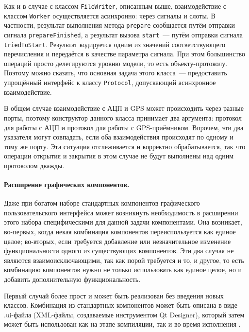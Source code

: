 \documentclass[a4paper, 14pt, titlepage]{extarticle}
\newcommand{\inlinecode}[1]{\lstinline[basicstyle=\ttfamily]{#1}}
\newcommand{\eng}[1]{\foreignlanguage{english}{#1}}
\begin{document}
  Как и в случае с классом \inlinecode{FileWriter}, описанным выше, взаимодействие с классом
  \inlinecode{Worker} осуществляется асинхронно: через сигналы и слоты. В частности, результат
  выполнения метода \inlinecode{prepare} сообщается путём отправки сигнала
  \inlinecode{prepareFinished}, а результат вызова \inlinecode{start}~--- путём отправки сигнала
  \inlinecode{triedToStart}. Результат кодируется одним из значений соответствующего перечисления и
  передаётся в качестве параметра сигнала. При этом большинство операций просто делегируются уровню
  модели, то есть объекту-протоколу. Поэтому можно сказать, что основная задача этого класса~---
  предоставить упрощённый интерфейс к классу \inlinecode{Protocol}, допускающий асинхронное
  взаимодействие.

  В общем случае взаимодействие с АЦП и GPS может происходить через разные порты, поэтому конструктор
  данного класса принимает два аргумента: протокол для работы с АЦП и протокол для работы с
  GPS-приёмником. Впрочем, эти два указателя могут совпадать, если оба взаимодействия происходят по одному и
  тому же порту. Эта ситуация отслеживается и корректно обрабатывается, так что операции открытия и
  закрытия в этом случае не будут выполнены над одним протоколом дважды.

  \paragraph{Расширение графических компонентов.}
  Даже при богатом наборе стандартных компонентов графического пользовательского интерфейса может
  возникнуть необходимость в расширении этого набора специфическими для данной задачи компонентами.
  Она возникает, во-первых, когда некая комбинация компонентов переиспользуется как единое целое;
  во-вторых, если требуется добавление или незначительное изменение функциональности одного из
  существующих компонентов. Эти два случая не являются взаимоисключающими, так как порой
  требуется и то, и другое, то есть комбинацию компонентов нужно не только использовать как единое
  целое, но и добавить дополнительную функциональность.

  Первый случай более прост и может быть реализован без введения новых классов. Комбинация из
  стандартных компонентов может быть описана в виде .ui-файла (XML-файлы, создаваемые инструментом
  \eng{Qt Designer}), который затем может быть использован как на этапе компиляции, так и во время
  исполнения \cite{qt-ui-file}.
\end{document}

